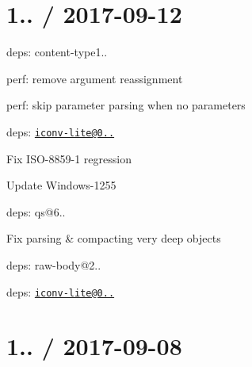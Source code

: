 \section*{1.. / 2017-\/09-\/12 }


\begin{DoxyItemize}
\item deps\+: content-\/type1..
\begin{DoxyItemize}
\item perf\+: remove argument reassignment
\item perf\+: skip parameter parsing when no parameters
\end{DoxyItemize}
\item deps\+: \href{mailto:iconv-lite@0.4.19}{\tt iconv-\/lite@0..}
\begin{DoxyItemize}
\item Fix I\+S\+O-\/8859-\/1 regression
\item Update Windows-\/1255
\end{DoxyItemize}
\item deps\+: qs@6..
\begin{DoxyItemize}
\item Fix parsing \& compacting very deep objects
\end{DoxyItemize}
\item deps\+: raw-\/body@2..
\begin{DoxyItemize}
\item deps\+: \href{mailto:iconv-lite@0.4.19}{\tt iconv-\/lite@0..}
\end{DoxyItemize}
\end{DoxyItemize}

\section*{1.. / 2017-\/09-\/08 }


